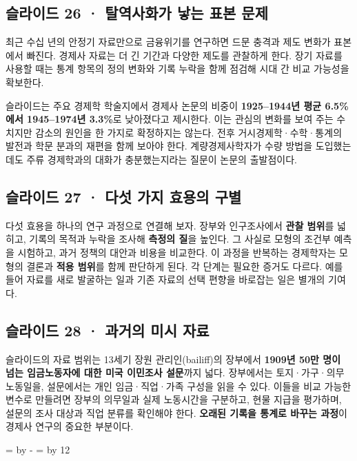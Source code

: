 \documentclass[10pt,a4paper]{article}
\newcommand{\ReserveQuestionSpace}{%
  \par\begingroup
  \dimen0=\pagegoal \advance\dimen0 by -\pagetotal
  \dimen2=\baselineskip \multiply\dimen2 by 12
  \ifdim\dimen0<\dimen2 \newpage\fi
  \endgroup}
\begin{document}
\subsection{슬라이드 26 · 탈역사화가 낳는 표본 문제}
최근 수십 년의 안정기 자료만으로 금융위기를 연구하면 드문 충격과 제도 변화가 표본에서 빠진다. 경제사 자료는 더 긴 기간과 다양한 제도를 관찰하게 한다. 장기 자료를 사용할 때는 통계 항목의 정의 변화와 기록 누락을 함께 점검해 시대 간 비교 가능성을 확보한다.\par

슬라이드는 주요 경제학 학술지에서 경제사 논문의 비중이 \textbf{1925–1944년 평균 6.5\%에서 1945–1974년 3.3\%}로 낮아졌다고 제시한다. 이는 관심의 변화를 보여 주는 수치지만 감소의 원인을 한 가지로 확정하지는 않는다. 전후 거시경제학·수학·통계의 발전과 학문 분과의 재편을 함께 보아야 한다. 계량경제사학자가 수량 방법을 도입했는데도 주류 경제학과의 대화가 충분했는지라는 질문이 논문의 출발점이다.\par

\subsection{슬라이드 27 · 다섯 가지 효용의 구별}
다섯 효용을 하나의 연구 과정으로 연결해 보자. 장부와 인구조사에서 \textbf{관찰 범위}를 넓히고, 기록의 목적과 누락을 조사해 \textbf{측정의 질}을 높인다. 그 사실로 모형의 조건부 예측을 시험하고, 과거 정책의 대안과 비용을 비교한다. 이 과정을 반복하는 경제학자는 모형의 결론과 \textbf{적용 범위}를 함께 판단하게 된다. 각 단계는 필요한 증거도 다르다. 예를 들어 자료를 새로 발굴하는 일과 기존 자료의 선택 편향을 바로잡는 일은 별개의 기여다.\par

\subsection{슬라이드 28 · 과거의 미시 자료}
슬라이드의 자료 범위는 13세기 장원 관리인(bailiff)의 장부에서 \textbf{1909년 50만 명이 넘는 임금노동자에 대한 미국 이민조사 설문}까지 넓다. 장부에서는 토지·가구·의무 노동일을, 설문에서는 개인 임금·직업·가족 구성을 읽을 수 있다. 이들을 비교 가능한 변수로 만들려면 장부의 의무일과 실제 노동시간을 구분하고, 현물 지급을 평가하며, 설문의 조사 대상과 직업 분류를 확인해야 한다. \textbf{오래된 기록을 통계로 바꾸는 과정}이 경제사 연구의 중요한 부분이다.\par

\ReserveQuestionSpace
\end{document}
